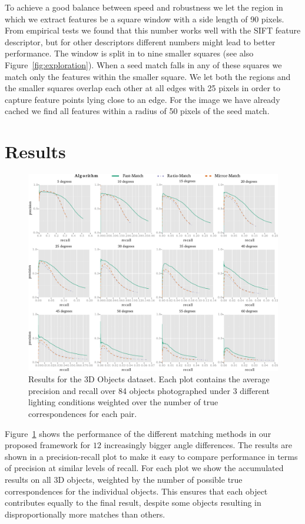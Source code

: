 \documentclass[10pt,twocolumn,letterpaper]{article}
\begin{document}
To achieve a good balance between speed and robustness we let the region in which we extract features be a square window with a side length of 90 pixels. From empirical tests we found that this number works well with the SIFT feature descriptor, but for other descriptors different numbers might lead to better performance. The window is split in to nine smaller squares (see also Figure~\ref{fig:exploration}). When a seed match falls in any of these squares we match only the features within the smaller square. We let both the regions and the smaller squares overlap each other at all edges with 25 pixels in order to capture feature points lying close to an edge. For the image we have already cached we find all features within a radius of 50 pixels of the seed match.

\section{Results}
\label{results}
%
\begin{figure}[t]
\centering
\includegraphics[width=1\columnwidth]{images/grid_match_all}
\caption{Results for the 3D Objects dataset. Each plot contains the
average precision and recall over 84 objects photographed under 3 different lighting conditions weighted over the number of true correspondences for each pair.}
\label{fig:all_objects}
\end{figure}

Figure~\ref{fig:all_objects} shows the performance of the different matching methods in our proposed framework for $12$ increasingly bigger angle differences. The results are shown in a precision-recall plot to make it easy to compare performance in terms of precision at similar levels of recall.  For each plot we show the accumulated results on all 3D objects, weighted by the number of possible true correspondences for the individual objects. This ensures that each object contributes equally to the final result, despite some objects resulting in disproportionally more matches than others.
\end{document}
